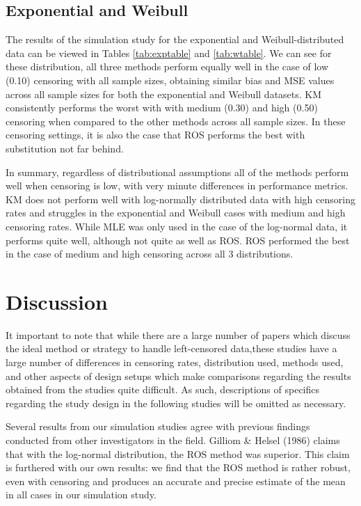 \documentclass[12pt, twoside]{amherstthesis}
\begin{document}
\hypertarget{exponentialweibullsimstudy}{%
\subsection{Exponential and Weibull}\label{exponentialweibullsimstudy}}

The results of the simulation study for the exponential and Weibull-distributed data can be viewed in Tables \ref{tab:exptable} and \ref{tab:wtable}. We can see for these distribution, all three methods perform equally well in the case of low (0.10) censoring with all sample sizes, obtaining similar bias and MSE values across all sample sizes for both the exponential and Weibull datasets. KM consistently performs the worst with with medium (0.30) and high (0.50) censoring when compared to the other methods across all sample sizes. In these censoring settings, it is also the case that ROS performs the best with substitution not far behind.

In summary, regardless of distributional assumptions all of the methods perform well when censoring is low, with very minute differences in performance metrics. KM does not perform well with log-normally distributed data with high censoring rates and struggles in the exponential and Weibull cases with medium and high censoring rates. While MLE was only used in the case of the log-normal data, it performs quite well, although not quite as well as ROS. ROS performed the best in the case of medium and high censoring across all 3 distributions.

\hypertarget{discussion}{%
\section{Discussion}\label{discussion}}

It important to note that while there are a large number of papers which discuss the ideal method or strategy to handle left-censored data,these studies have a large number of differences in censoring rates, distribution used, methods used, and other aspects of design setups which make comparisons regarding the results obtained from the studies quite difficult. As such, descriptions of specifics regarding the study design in the following studies will be omitted as necessary.

Several results from our simulation studies agree with previous findings conducted from other investigators in the field. Gilliom \& Helsel (1986) claims that with the log-normal distribution, the ROS method was superior. This claim is furthered with our own results: we find that the ROS method is rather robust, even with censoring and produces an accurate and precise estimate of the mean in all cases in our simulation study.
\end{document}

